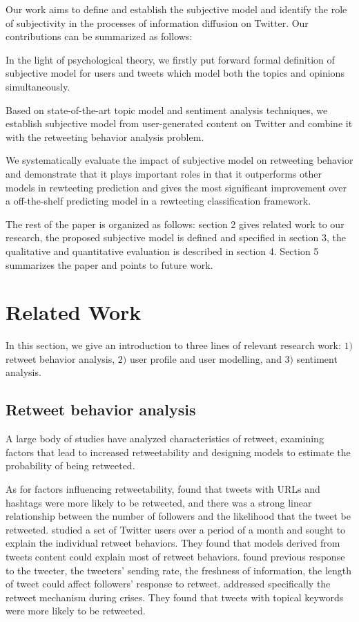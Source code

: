 \documentclass{acm_proc_article-sp}
\begin{document}
Our work aims to define and establish the subjective model and identify the role of subjectivity in the processes of information diffusion on Twitter. Our contributions can be summarized as follows:
\begin{itemize*}
\item In the light of psychological theory, we firstly put forward formal definition of subjective model for users and tweets which model both the topics and opinions simultaneously.
\item Based on state-of-the-art topic model and sentiment analysis techniques, we establish subjective model from user-generated content on Twitter and combine it with the retweeting behavior analysis problem.
\item We systematically evaluate the impact of subjective model on retweeting behavior and demonstrate that it plays important roles in that it outperforms other models in rewteeting prediction and gives the most significant improvement over a off-the-shelf predicting model in a rewteeting classification framework. 
\end{itemize*}
The rest of the paper is organized as follows: section 2 gives related work to our research, the proposed subjective model is defined and specified in section 3, the qualitative and quantitative evaluation is described in section 4. Section 5 summarizes the paper and points to future work.

\section{Related Work}
\label{relatedwork}
In this section, we give an introduction to three lines of relevant research work: $ 1) $ retweet behavior analysis, $ 2) $ user profile and user modelling, and $  3)$ sentiment analysis. 
\subsection{Retweet behavior analysis}
A large body of studies have analyzed characteristics of retweet, examining factors that lead to increased retweetability and designing models to estimate the probability of being retweeted. 

As for factors influencing retweetability, \cite{Suh2010} found that tweets with URLs and hashtags were more likely to be retweeted, and there was a strong linear relationship between the number of followers and the likelihood that the tweet be retweeted. 
\cite{conf/icwsm/MacskassyM11} studied a set of Twitter users over a period of a month and sought to explain the individual retweet behaviors.
They found that models derived from tweets content could explain most of retweet behaviors.
\cite{Comarela:2012UFA} found previous response to the tweeter, the tweeters’ sending rate, the freshness of information, the length of tweet could affect followers’ response to retweet. 
\cite{Starbird:2012RRI} addressed specifically the retweet mechanism during crises. 
They found that tweets with topical keywords were more likely to be retweeted. 
\end{document}

